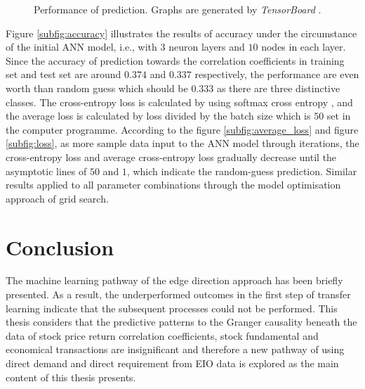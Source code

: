\begin{figure}
	
	\caption{Performance of prediction. Graphs are generated by \textit{TensorBoard} \cite{tensorflow2015-whitepaper}.}
	\label{fig:prediction}
\end{figure}

Figure \ref{subfig:accuracy} illustrates the results of accuracy under the circumstance of the initial ANN model, i.e., with $3$ neuron layers and $10$ nodes in each layer. Since the accuracy of prediction towards the correlation coefficients in training set and test set are around $0.374$ and $0.337$ respectively, the performance are even worth than random guess which should be $0.333$ as there are three distinctive classes. The cross-entropy loss is calculated by using softmax cross entropy \cite{tensorflow2015-whitepaper}, and the average loss is calculated by loss divided by the batch size which is $50$ set in the computer programme. According to the figure \ref{subfig:average_loss} and figure \ref{subfig:loss}, as more sample data input to the ANN model through iterations, the cross-entropy loss and average cross-entropy loss gradually decrease until the asymptotic lines of $50$ and $1$, which indicate the random-guess prediction. Similar results applied to all parameter combinations through the model optimisation approach of grid search.

\section{Conclusion}
The machine learning pathway of the edge direction approach has been briefly presented. As a result, the underperformed outcomes in the first step of transfer learning indicate that the subsequent processes could not be performed. This thesis considers that the predictive patterns to the Granger causality beneath the data of stock price return correlation coefficients, stock fundamental and economical transactions are insignificant and therefore a new pathway of using direct demand and direct requirement from EIO data is explored as the main content of this thesis presents.
